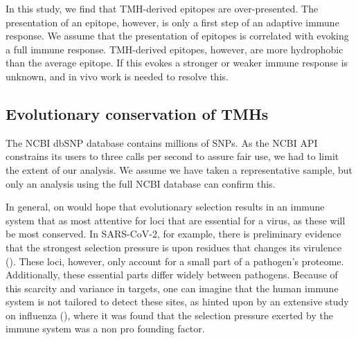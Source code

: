 
In this study, we find that TMH-derived epitopes are over-presented.
The presentation of an epitope, however, 
is only a first step of an adaptive immune response.
We assume that the presentation of epitopes is
correlated with evoking a full immune response.
TMH-derived epitopes, however, are more hydrophobic than the average
epitope. If this evokes a stronger or weaker immune response is unknown,
and in vivo work is needed to resolve this.

\subsection{Evolutionary conservation of TMHs}


The NCBI dbSNP database contains millions of SNPs.
As the NCBI API constrains its users to three calls per second
to assure fair use, we had to limit the extent of our analysis.
We assume we have taken a representative sample, but only
an analysis using the full NCBI database can confirm this.

 
In general, on would hope that evolutionary selection results in
an immune system that as most attentive for loci that are
essential for a virus, as these will be most conserved.
In SARS-CoV-2, for example, there is preliminary evidence that the strongest
selection pressure is upon residues that changes its 
virulence (\cite{velazquez2020positive}).
These loci, however, only account for a small part of a pathogen's proteome.
Additionally, these essential parts differ widely between pathogens.
Because of this scarcity and variance in targets, 
one can imagine that the human immune system 
is not tailored to detect these sites, 
as hinted upon by an extensive study on influenza (\cite{han2019individual}),
where it was found that the selection pressure
exerted by the immune system was a non pro founding factor.
 
